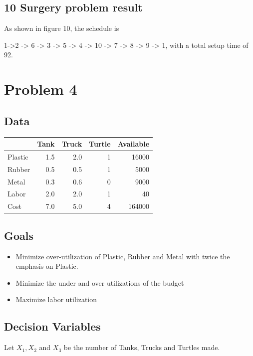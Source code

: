 \documentclass[]{article}
\providecommand{\tightlist}{%
  \setlength{\itemsep}{0pt}\setlength{\parskip}{0pt}}
\begin{document}
\subsection{10 Surgery problem result}\label{surgery-problem-result-1}

As shown in figure 10, the schedule is

1-\textgreater{}2 -\textgreater{} 6 -\textgreater{} 3 -\textgreater{} 5
-\textgreater{} 4 -\textgreater{} 10 -\textgreater{} 7 -\textgreater{} 8
-\textgreater{} 9 -\textgreater{} 1, with a total setup time of 92.

\section{Problem 4}\label{problem-4}

\subsection{Data}\label{data}

\begin{longtable}[]{@{}lrrrr@{}}
\toprule
& Tank & Truck & Turtle & Available\tabularnewline
\midrule
\endhead
Plastic & 1.5 & 2.0 & 1 & 16000\tabularnewline
Rubber & 0.5 & 0.5 & 1 & 5000\tabularnewline
Metal & 0.3 & 0.6 & 0 & 9000\tabularnewline
Labor & 2.0 & 2.0 & 1 & 40\tabularnewline
Cost & 7.0 & 5.0 & 4 & 164000\tabularnewline
\bottomrule
\end{longtable}

\subsection{Goals}\label{goals}

\begin{itemize}
\tightlist
\item
  Minimize over-utilization of Plastic, Rubber and Metal with twice the
  emphasis on Plastic.
\item
  Minimize the under and over utilizations of the budget
\item
  Maximize labor utilization
\end{itemize}

\subsection{Decision Variables}\label{decision-variables-2}

Let \(X_{1}, X_{2}\) and \(X_{3}\) be the number of Tanks, Trucks and
Turtles made.
\end{document}
